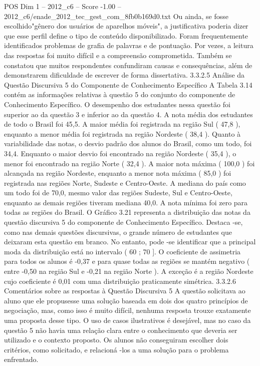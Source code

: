 \begin{textsample}{POS Dim 1 – 2012\_c6 – Score -1.00 – 2012\_c6/enade\_2012\_tec\_gest\_com\_8fb0b169d0.txt}
Ou ainda, se fosse escolhido"gênero dos usuários de aparelhos móveis", a justificativa poderia dizer que esse perfil define o tipo de conteúdo disponibilizado.
Foram frequentemente identificados problemas de grafia de palavras e de pontuação.
Por vezes, a leitura das respostas foi muito difícil e a compreensão comprometida.
Também se constatou que muitos respondentes confundiram causas e consequências, além de demonstrarem dificuldade de escrever de forma dissertativa. 3.3.2.5 Análise da Questão Discursiva 5 do Componente de Conhecimento Específico A Tabela 3.14 contém as informações relativas à questão 5 do conjunto do componente de Conhecimento Específico.
O desempenho dos estudantes nessa questão foi superior ao da questão 3 e inferior ao da questão 4.
A nota média dos estudantes de todo o Brasil foi 45,5.
A maior média foi registrada na região Sul ( 47,8 ), enquanto a menor média foi registrada na região Nordeste ( 38,4 ).
Quanto à variabilidade das notas, o desvio padrão dos alunos do Brasil, como um todo, foi 34,4.
Enquanto o maior desvio foi encontrado na região Nordeste ( 35,4 ), o menor foi encontrado na região Norte ( 32,4 ).
A maior nota máxima ( 100,0 ) foi alcançada na região Nordeste, enquanto a menor nota máxima ( 85,0 ) foi registrada nas regiões Norte, Sudeste e Centro-Oeste.
A mediana do país como um todo foi de 70,0, mesmo valor das regiões Sudeste, Sul e Centro-Oeste, enquanto as demais regiões tiveram mediana 40,0.
A nota mínima foi zero para todas as regiões do Brasil.
O Gráfico 3.21 representa a distribuição das notas da questão discursiva 5 do componente de Conhecimento Específico.
Destaca -se, como nas demais questões discursivas, o grande número de estudantes que deixaram esta questão em branco.
No entanto, pode -se identificar que a principal moda da distribuição está no intervalo ( 60 ; 70 ].
O coeficiente de assimetria para todos os alunos é -0,37 e para quase todas as regiões se mantém negativo ( entre -0,50 na região Sul e -0,21 na região Norte ).
A exceção é a região Nordeste cujo coeficiente é 0,01 com uma distribuição praticamente simétrica. 3.3.2.6 Comentários sobre as respostas à Questão Discursiva 5 A questão solicitava ao aluno que ele propusesse uma solução baseada em dois dos quatro princípios de negociação, mas, como isso é muito difícil, nenhuma resposta trouxe exatamente uma proposta desse tipo.
O uso de casos ilustrativos é desejável, mas no caso da questão 5 não havia uma relação clara entre o conhecimento que deveria ser utilizado e o contexto proposto.
Os alunos não conseguiram escolher dois critérios, como solicitado, e relacioná -los a uma solução para o problema enfrentado.

\end{textsample}
